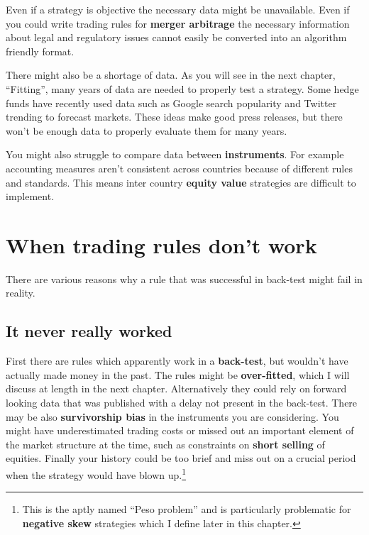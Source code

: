 Even if a strategy is objective the necessary data might be unavailable. Even if you could write trading rules for \textbf{merger arbitrage} the necessary information about legal and regulatory issues cannot easily be converted into an algorithm friendly format.

There might also be a shortage of data. As you will see in the next chapter, ``Fitting'', many years of data are needed to properly test a strategy. Some hedge funds have recently used data such as Google search popularity and Twitter trending to forecast markets. These ideas make good press releases, but there won't be enough data to properly evaluate them for many years.

You might also struggle to compare data between \textbf{instruments}. For example accounting measures aren't consistent across countries because of different rules and standards. This means inter country \textbf{equity value} strategies are difficult to implement.

\section*{When trading rules don't work}  {}


There are various reasons why a rule that was successful in back-test might fail in reality.

\subsection*{It never really worked}

First there are rules which apparently work in a \textbf{back-test}, but wouldn't have actually made money in the past. The rules might be \textbf{over-fitted}, which I will discuss at length in the next chapter. Alternatively they could rely on forward looking data that was published with a delay not present in the back-test. There may be also \textbf{survivorship bias} in the instruments you are considering. You might have underestimated trading costs or missed out an important element of the market structure at the time, such as constraints on \textbf{short selling} of equities. Finally your history could be too brief and miss out on a crucial period when the strategy would have blown up.\footnote{This is the aptly named ``Peso problem'' and is particularly problematic for \textbf{negative skew} strategies which I define later in this chapter.}

